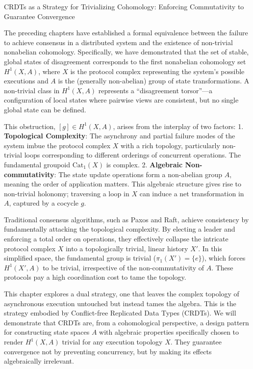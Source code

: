 \documentclass[
]{article}
\begin{document}
CRDTs as a Strategy for Trivializing Cohomology: Enforcing Commutativity
to Guarantee Convergence

The preceding chapters have established a formal equivalence between the
failure to achieve consensus in a distributed system and the existence
of non-trivial nonabelian cohomology. Specifically, we have demonstrated
that the set of stable, global states of disagreement corresponds to the
first nonabelian cohomology set \(H^1(X, A)\), where \(X\) is the
protocol complex representing the system's possible executions and \(A\)
is the (generally non-abelian) group of state transformations. A
non-trivial class in \(H^1(X, A)\) represents a ``disagreement
torsor''---a configuration of local states where pairwise views are
consistent, but no single global state can be defined.

This obstruction, \([g] \in H^1(X, A)\), arises from the interplay of
two factors: 1. \textbf{Topological Complexity}: The asynchrony and
partial failure modes of the system imbue the protocol complex \(X\)
with a rich topology, particularly non-trivial loops corresponding to
different orderings of concurrent operations. The fundamental groupoid
\(\text{Cat}_1(X)\) is complex. 2. \textbf{Algebraic Non-commutativity}:
The state update operations form a non-abelian group \(A\), meaning the
order of application matters. This algebraic structure gives rise to
non-trivial holonomy; traversing a loop in \(X\) can induce a net
transformation in \(A\), captured by a cocycle \(g\).

Traditional consensus algorithms, such as Paxos and Raft, achieve
consistency by fundamentally attacking the topological complexity. By
electing a leader and enforcing a total order on operations, they
effectively collapse the intricate protocol complex \(X\) into a
topologically trivial, linear history \(X'\). In this simplified space,
the fundamental group is trivial (\(\pi_1(X') = \{e\}\)), which forces
\(H^1(X', A)\) to be trivial, irrespective of the non-commutativity of
\(A\). These protocols pay a high coordination cost to tame the
topology.

This chapter explores a dual strategy, one that leaves the complex
topology of asynchronous execution untouched but instead tames the
algebra. This is the strategy embodied by Conflict-free Replicated Data
Types (CRDTs). We will demonstrate that CRDTs are, from a cohomological
perspective, a design pattern for constructing state spaces \(A\) with
algebraic properties specifically chosen to render \(H^1(X, A)\) trivial
for any execution topology \(X\). They guarantee convergence not by
preventing concurrency, but by making its effects algebraically
irrelevant.
\end{document}
